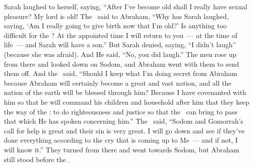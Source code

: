 \begin{inparaenum}
   Sarah laughed to herself, saying, ``After I've become old shall I really have sexual pleasure? My lord is old!%
   The \lord\ said to Abraham, ``Why has Sarah laughed, saying, `Am I really going to give birth now that I'm old?'%
   Is anything too difficult for the \lord? At the appointed time I will return to you~--- at the time of life~--- and Sarah will have a son.''%
   But Sarah denied, saying, ``I didn't laugh'' (because she was afraid). And He said, ``No, you did laugh.''%
   The men rose up from there and looked down on Sodom, and Abraham went with them to send them off.%
   And the \lord\ said, ``Should I keep what I'm doing secret from Abraham%
   because Abraham will certainly become a great and vast nation, and all the nation of the earth will be blessed through him?%
   Because I have covenanted with him so that he will command his children and household after him that they keep the way of the \lord: to do righteousness and justice so that the \lord\ can bring to pass that which He has spoken concerning him.''%
   The \lord\ said, ``Sodom and Gomorrah's call for help is great and their sin is very great.%
   I will go down and see if they've done everything according to the cry that is coming up to Me~--- and if not, I will know it.''%
   They turned from there and went towards Sodom, but Abraham still stood before the \lord.%

\end{inparaenum}
